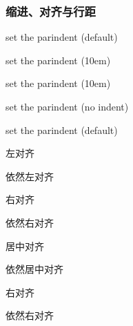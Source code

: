 \documentclass{ctexart}
\begin{document}
        \subsubsection{缩进、对齐与行距}
            set the parindent (default)
        
            {\setlength{\parindent}{10em} set the parindent (10em)

            set the parindent (10em)}

            \noindent set the parindent (no indent)

            set the parindent (default)

            \begin{flushleft}
                左对齐

                依然左对齐
            \end{flushleft}

            \begin{flushright}
                右对齐

                依然右对齐
            \end{flushright}

            \begin{center}
                居中对齐

                依然居中对齐
            \end{center}
        
            {\raggedleft 右对齐
            
            依然右对齐

            }
\end{document}
